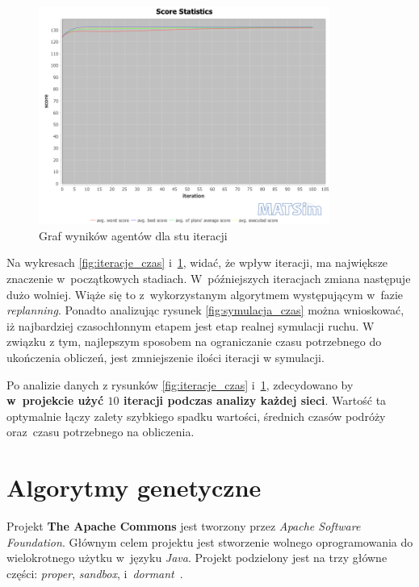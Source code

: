 \documentclass[twoside,12pt]{report}
\begin{document}
\begin{figure}[htbp]
	\centering
	\includegraphics[width=0.85\textwidth]{img/def_scorestats}
	\caption{Graf wyników agentów dla stu iteracji}
	\label{fig:iteracje_wynik}
\end{figure}

Na wykresach \ref{fig:iteracje_czas} i~\ref{fig:iteracje_wynik}, widać, że wpływ iteracji, ma największe znaczenie w~początkowych stadiach. W~późniejszych iteracjach zmiana następuje dużo wolniej. Wiąże się to z~wykorzystanym algorytmem występującym w~fazie \textit{replanning}. Ponadto analizując rysunek \ref{fig:symulacja_czas} można wnioskować, iż najbardziej czasochłonnym etapem jest etap realnej symulacji ruchu. W związku z tym, najlepszym sposobem na ograniczanie czasu potrzebnego do ukończenia obliczeń, jest zmniejszenie ilości iteracji w symulacji.

Po analizie danych z rysunków \ref{fig:iteracje_czas} i~\ref{fig:iteracje_wynik}, zdecydowano by \textbf{w~projekcie użyć $10$ iteracji podczas analizy każdej sieci}. Wartość ta optymalnie łączy zalety szybkiego spadku wartości, średnich czasów podróży oraz~czasu potrzebnego na obliczenia.

\section{Algorytmy genetyczne}

Projekt \textbf{The Apache Commons} jest tworzony przez \textit{Apache Software Foundation}. Głównym celem projektu jest stworzenie wolnego oprogramowania do wielokrotnego użytku w~języku \textit{Java}. Projekt podzielony jest na trzy główne części: \textit{proper}, \textit{sandbox}, i~\textit{dormant}~\cite{math}.
\end{document}
